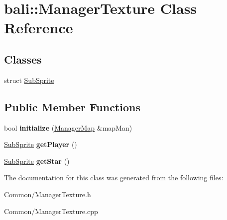 \hypertarget{classbali_1_1_manager_texture}{\section{bali\-:\-:Manager\-Texture Class Reference}
\label{classbali_1_1_manager_texture}
}
\subsection*{Classes}
\begin{DoxyCompactItemize}
\item 
struct \hyperlink{structbali_1_1_manager_texture_1_1_sub_sprite}{Sub\-Sprite}
\end{DoxyCompactItemize}
\subsection*{Public Member Functions}
\begin{DoxyCompactItemize}
\item 
\hypertarget{classbali_1_1_manager_texture_a718aea4eef92f5ff5c3e20f325c9a6af}{bool {\bfseries initialize} (\hyperlink{classbali_1_1_manager_map}{Manager\-Map} \&map\-Man)}\label{classbali_1_1_manager_texture_a718aea4eef92f5ff5c3e20f325c9a6af}

\item 
\hypertarget{classbali_1_1_manager_texture_a7268c8bbfa0a6d9c216ea789dd7d60c2}{\hyperlink{structbali_1_1_manager_texture_1_1_sub_sprite}{Sub\-Sprite} {\bfseries get\-Player} ()}\label{classbali_1_1_manager_texture_a7268c8bbfa0a6d9c216ea789dd7d60c2}

\item 
\hypertarget{classbali_1_1_manager_texture_aba1168bcb2d6efbbc1d286ef89617efd}{\hyperlink{structbali_1_1_manager_texture_1_1_sub_sprite}{Sub\-Sprite} {\bfseries get\-Star} ()}\label{classbali_1_1_manager_texture_aba1168bcb2d6efbbc1d286ef89617efd}

\end{DoxyCompactItemize}


The documentation for this class was generated from the following files\-:\begin{DoxyCompactItemize}
\item 
Common/Manager\-Texture.\-h\item 
Common/Manager\-Texture.\-cpp\end{DoxyCompactItemize}
